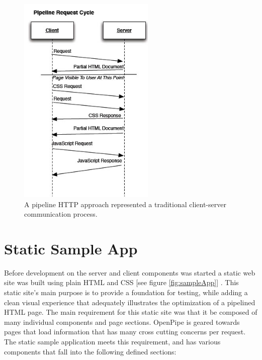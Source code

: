 \documentclass[12pt]{report}
\begin{document}
\begin{figure}[H]
\label{fig:pipelinedRequestCycle}
\centering
\includegraphics[width=65mm]{figures/images/pipeline_request_cycle.png}
\caption{A pipeline HTTP approach represented a traditional client-server communication process.}
\end{figure}


\section{Static Sample App}
Before development on the server and client components was started a static web site was built using plain HTML and CSS [see figure \ref{fig:sampleApp}] . This static site’s main purpose is to provide a foundation for testing, while adding a clean visual experience that adequately illustrates the optimization of a pipelined HTML page. The main requirement for this static site was that it be composed of many individual components and page sections. OpenPipe is geared towards pages that load information that has many cross cutting concerns per request. The static sample application meets this requirement, and has various components that fall into the following defined sections:
\end{document}
